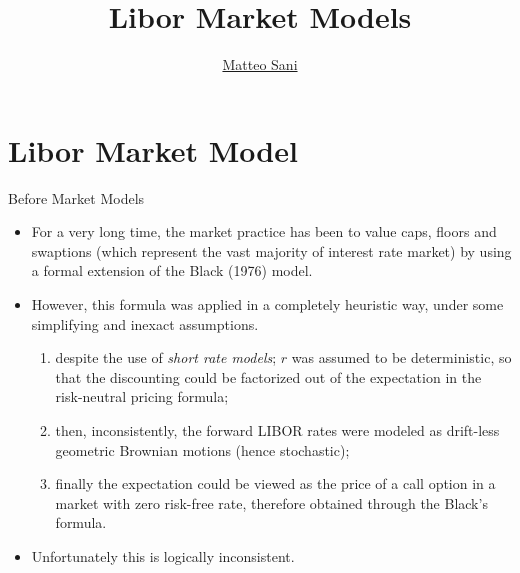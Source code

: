 \documentclass{beamer}
\title{Libor Market Models}
\author{\href{mailto:matteo.sani@unisi.it}{Matteo Sani}}
\begin{document}
\begin{frame}[plain]
  \maketitle
\end{frame}

\section{Libor Market Model}
\begin{frame}{Before Market Models}
  \begin{itemize}
  \item<1-> For a very long time, the market practice has been to value caps, floors and swaptions (which represent the vast majority of interest rate market) by using a formal extension of the Black (1976) model. 
  \item<2-> However, this formula was applied in a completely heuristic way, under some simplifying and inexact assumptions.
    \begin{enumerate}
    \item despite the use of \emph{short rate models}; $r$ was assumed to be deterministic, so that the discounting could be factorized out of the expectation in the risk-neutral pricing formula; 
    \item then, inconsistently, the forward LIBOR rates were modeled as drift-less geometric Brownian motions (hence stochastic);
    \item finally the expectation could be viewed as the price of a call option in a market with zero risk-free rate, therefore obtained through the Black’s formula.
    \end{enumerate} 
  \item<3-> Unfortunately this is logically inconsistent.
  \end{itemize}
\end{frame}
\end{document}
